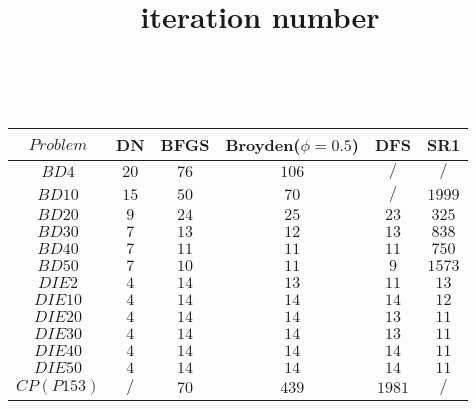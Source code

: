 \documentclass{article}
\begin{document}
		 
\begin{table}[h!]
\title{ iteration number }
\\
	\centering
	\begin{tabular}{|c||c|c|c|c|c|}
		\hline
		 $Problem$ & DN & BFGS & Broyden($\phi=0.5$) & DFS & SR1 \\ \hline
		  
		 $BD4$ & $20$ & $76$ & $106$ & $/$ & $/$ \\ \hline
		 
		 $BD10$ & $15$ & $50$ & $70$ & $/$ & $1999$ \\ \hline
		 
		 $BD20$ & $9$ & $24$ & $25$ & $23$ & $325$ \\ \hline
		 
		 $BD30$ & $7$ & $13$ & $12$ & $13$ & $838$ \\ \hline
		 
		 $BD40$ & $7$ & $11$ & $11$ & $11$ & $750$ \\ \hline
		  
		 $BD50$ & $7$ & $10$ & $11$ & $9$ & $1573$ \\ \hline
		 
		 $DIE2$ & $4$ & $14$ & $13$ & $11$ & $13$ \\ \hline
		 
		 $DIE10$ & $4$ & $14$ & $14$ & $14$ & $12$ \\ \hline
		 
		 $DIE20$ & $4$ & $14$ & $14$ & $13$ & $11$ \\ \hline
		 
		 $DIE30$ & $4$ & $14$ & $14$ & $13$ & $11$ \\ \hline
		 
		 $DIE40$ & $4$ & $14$ & $14$ & $14$ & $11$ \\ \hline
		  
		 $DIE50$ & $4$ & $14$ & $14$ & $14$ & $11$ \\ \hline
		 
		 $CP(P153)$ & $/$ & $70$ & $439$ & $1981$ & $/$ \\ \hline
		
	\end{tabular}

\end{table}
\end{document}

